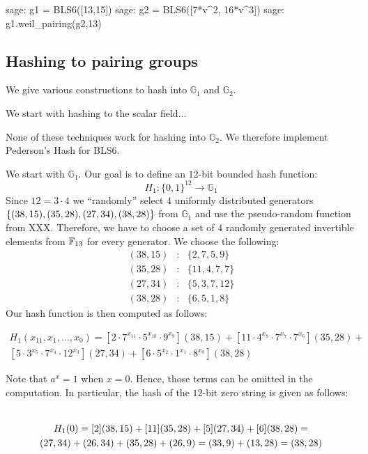 \begin{sagecommandline}
sage: g1 = BLS6([13,15])
sage: g2 = BLS6([7*v^2, 16*v^3])
sage: g1.weil_pairing(g2,13)
\end{sagecommandline}

\subsection{Hashing to pairing groups}
We give various constructions to hash into $\mathbb{G}_1$ and $\mathbb{G}_2$. 

We start with hashing to the scalar field... 

None of these techniques work for hashing into $\mathbb{G}_2$. We therefore implement Pederson's Hash for BLS6. 

We start with $\mathbb{G}_1$. Our goal is to define an $12$-bit bounded hash function:
$$
H_{1}: \{0,1\}^{12} \to \mathbb{G}_1 
$$
Since $12= 3\cdot 4$ we ``randomly'' select $4$ uniformly distributed generators $\{(38, 15), (35,28),\\ (27, 34), (38, 28)\}$ from $\mathbb{G}_1$ and use the pseudo-random function from XXX. 
Therefore, we have to choose a set of $4$ randomly generated invertible elements from $\F_{13}$ for every generator. We choose the following:
$$
\begin{array}{lcl}
(38,15) &:& \{2,7,5,9\}\\
(35,28) &:& \{11,4,7,7\}\\
(27,34) &:& \{5,3,7,12\}\\
(38,28) &:& \{6,5,1,8\}
\end{array}
$$
Our hash function is then computed as follows:

\begin{multline*}
H_1(x_{11},x_1,\ldots, x_{0})=
[2\cdot 7^{x_{11}}\cdot 5^{x_{10}}\cdot 9^{x_9}](38,15)+
[11\cdot 4^{x_8}\cdot 7^{x_7}\cdot 7^{x_6}](35,28)+\\
[5\cdot 3^{x_5}\cdot 7^{x_4}\cdot 12^{x_3}](27,34) +
[6\cdot 5^{x_2}\cdot 1^{x_{1}}\cdot 8^{x_{0}}](38,28)
\end{multline*}

Note that $a^x=1$ when $x=0$. Hence, those terms can be omitted in the computation. 
In particular, the hash of the $12$-bit zero string is given as follows:

\begin{multline*}\smelong{WRONG-ORDERING-REDO}\\
H_1(0)= [2](38,15)+[11](35,28)+[5](27,34)+[6](38,28)= \\
(27,34)+(26,34)+(35,28)+(26,9)= (33,9) + (13,28) = (38,28)
\end{multline*}

